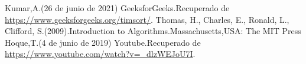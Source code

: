 \documentclass{article}
\begin{document}

\begin{thebibliography}{0}
    Kumar,A.(26 de junio de 2021) GeeksforGeeks.Recuperado de \url{https://www.geeksforgeeks.org/timsort/}.
   Thomas, H., Charles, E., Ronald, L., Clifford, S.(2009).Introduction to Algorithms.Massachusetts,USA: The MIT Press
    Hoque,T.(4 de junio de 2019) Youtube.Recuperado de \url{https://www.youtube.com/watch?v=_dlzWEJoU7I}.
\end{thebibliography}
\end{document}
